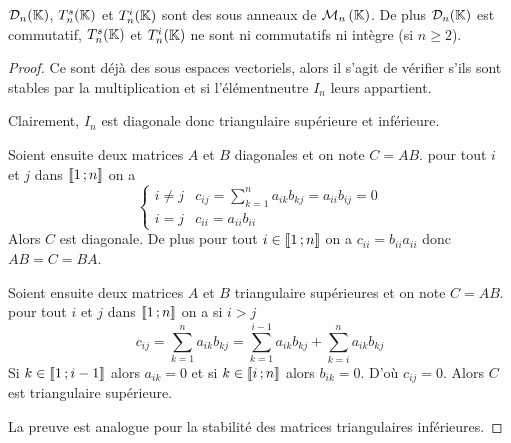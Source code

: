 \begin{prop}
  \(\mathcal{D}_n(\mathbb{K})\), \(T_n^s(\mathbb{K})\) et \(T_n^i(\mathbb{K})\) sont des sous anneaux de 
  \(\mathcal{M}_{n}\left(\mathbb{K}\right)\). De plus \(\mathcal{D}_n(\mathbb{K})\) est commutatif, \(T_n^s(\mathbb{K})\) et 
  \(T_n^i(\mathbb{K})\) ne sont ni commutatifs ni intègre (si \(n \geqslant 2\)).
\end{prop}
\begin{proof}
  Ce sont déjà des sous espaces vectoriels, alors il s'agit de vérifier s'ils 
  sont stables par la multiplication et si l'élémentneutre \(I_n\) leurs 
  appartient.

  Clairement, \(I_n\) est diagonale donc triangulaire supérieure et inférieure. 

  Soient ensuite deux matrices \(A\) et \(B\) diagonales et on note \(C=AB\). 
  pour tout \(i\) et \(j\) dans \(\mathopen{\llbracket}1\mathclose{}\mathpunct{};n\mathclose{\rrbracket}\) on a
  \begin{equation}
    \begin{cases}
      i \neq j & c_{ij} = \sum_{k=1}^n a_{ik}b_{kj}=a_{ii}b_{ij}=0 \\
      i=j & c_{ii}=a_{ii}b_{ii}
    \end{cases}
  \end{equation}
  Alors \(C\) est diagonale. De plus pour tout \(i \in \mathopen{\llbracket}1\mathclose{}\mathpunct{};n\mathclose{\rrbracket}\) 
  on a \(c_{ii}=b_{ii}a_{ii}\) donc \(AB=C=BA\). 

  Soient ensuite deux matrices \(A\) et \(B\) triangulaire supérieures et on 
  note \(C=AB\). pour tout \(i\) et \(j\) dans \(\mathopen{\llbracket}1\mathclose{}\mathpunct{};n\mathclose{\rrbracket}\) on a 
  si \(i > j\)
  \begin{equation}
    c_{ij}=\sum_{k=1}^n a_{ik} b_{kj} = \sum_{k=1}^{i-1} a_{ik} b_{kj} + 
    \sum_{k=i}^{n} a_{ik} b_{kj}
  \end{equation}
  Si \(k \in \mathopen{\llbracket}1\mathclose{}\mathpunct{};i-1\mathclose{\rrbracket}\) alors \(a_{ik}=0\) et si \(k \in 
  \mathopen{\llbracket}i\mathclose{}\mathpunct{};n\mathclose{\rrbracket}\) alors \(b_{ik}=0\). D'où \(c_{ij}=0\). Alors \(C\) 
  est triangulaire supérieure.

  La preuve est analogue pour la stabilité des matrices triangulaires 
  inférieures.
\end{proof}

